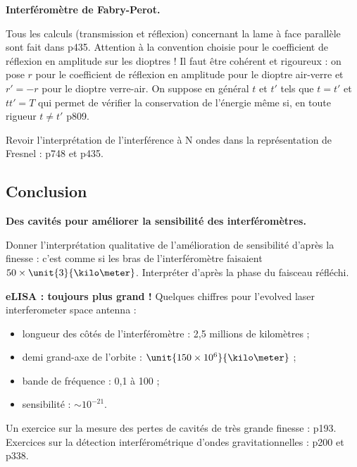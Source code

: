 \begin{experience}
\textbf{Interféromètre de Fabry-Perot.}
\end{experience}

\begin{remarque}
Tous les calculs (transmission et réflexion) concernant la lame à face parallèle sont fait dans \cite{Hecht2002} p435.
Attention à la convention choisie pour le coefficient de réflexion en amplitude sur les dioptres !
Il faut être cohérent et rigoureux : on pose $r$ pour le coefficient de réflexion en amplitude pour le dioptre air-verre et $r'=-r$ pour le dioptre verre-air.
On suppose en général $t$ et $t'$ tels que $t=t'$ et $tt'=T$ qui permet de vérifier la conservation de l'énergie même si, en toute rigueur $t\ne t'$ \cite{Olivier2000} p809.

\noindent
Revoir l'interprétation de l'interférence à N ondes dans la représentation de Fresnel : \cite{Sanz2016} p748 et \cite{Hecht2002} p435.  
\end{remarque}

\subsection*{Conclusion}

\begin{slide}
\textbf{Des cavités pour améliorer la sensibilité des interféromètres.}
\end{slide}

Donner l'interprétation qualitative de l'amélioration de sensibilité d'après la finesse : c'est comme si les bras de l'interféromètre faisaient $50\times \unit{3}{\kilo\meter}$.
Interpréter d'après la phase du faisceau réfléchi.

\begin{slide}
\textbf{eLISA : toujours plus grand !}
Quelques chiffres pour l'evolved laser interferometer space antenna :
\begin{itemize}
\item longueur des côtés de l'interféromètre : 2{,}5 millions de kilomètres ;
\item demi grand-axe de l'orbite : $\unit{150\times10^6}{\kilo\meter}$ ;
\item bande de fréquence : 0{,}1 à \unit{100}{\milli\hertz} ;
\item sensibilité : $\sim 10^{-21}$.
\end{itemize}
\end{slide}

\begin{funfact}
Un exercice sur la mesure des pertes de cavités de très grande finesse : \cite{Graner2011} p193.
Exercices sur la détection interférométrique d'ondes gravitationnelles : \cite{Graner2011} p200 et \cite{Augier2014} p338.
\end{funfact}


\newpage